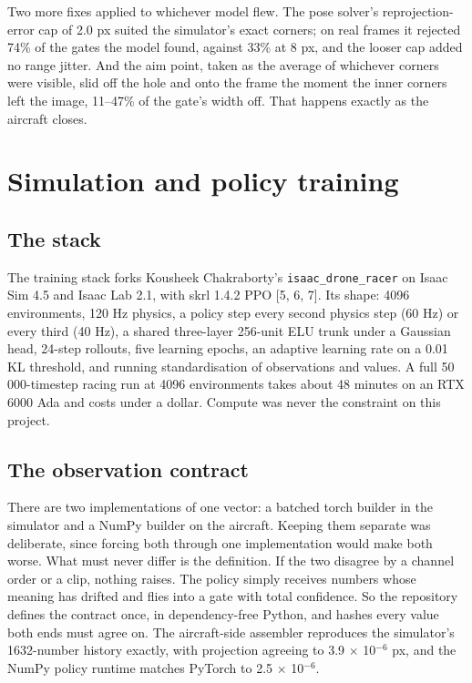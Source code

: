\documentclass{article}
\begin{document}
Two more fixes applied to whichever model flew. The pose solver's reprojection-error cap of 2.0 px suited the simulator's exact corners; on real frames it rejected 74\% of the gates the model found, against 33\% at 8 px, and the looser cap added no range jitter. And the aim point, taken as the average of whichever corners were visible, slid off the hole and onto the frame the moment the inner corners left the image, 11--47\% of the gate's width off. That happens exactly as the aircraft closes.

\section{Simulation and policy training}
\subsection{The stack}
The training stack forks Kousheek Chakraborty's \texttt{isaac\_drone\_racer} on Isaac Sim 4.5 and Isaac Lab 2.1, with skrl 1.4.2 PPO [5, 6, 7]. Its shape: 4096 environments, 120 Hz physics, a policy step every second physics step (60 Hz) or every third (40 Hz), a shared three-layer 256-unit ELU trunk under a Gaussian head, 24-step rollouts, five learning epochs, an adaptive learning rate on a 0.01 KL threshold, and running standardisation of observations and values. A full 50 000-timestep racing run at 4096 environments takes about 48 minutes on an RTX 6000 Ada and costs under a dollar. Compute was never the constraint on this project.

\subsection{The observation contract}
There are two implementations of one vector: a batched torch builder in the simulator and a NumPy builder on the aircraft. Keeping them separate was deliberate, since forcing both through one implementation would make both worse. What must never differ is the definition. If the two disagree by a channel order or a clip, nothing raises. The policy simply receives numbers whose meaning has drifted and flies into a gate with total confidence. So the repository defines the contract once, in dependency-free Python, and hashes every value both ends must agree on. The aircraft-side assembler reproduces the simulator's 1632-number history exactly, with projection agreeing to 3.9 $\times$ 10$^{-6}$ px, and the NumPy policy runtime matches PyTorch to 2.5 $\times$ 10$^{-6}$.
\end{document}
